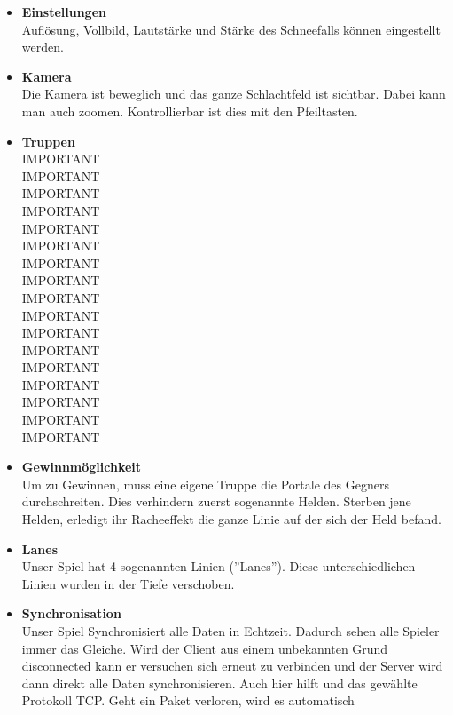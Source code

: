 \begin{itemize}
\begin{itemize}
        \end{itemize}
    \item \textbf{Einstellungen} \\
        Auflösung, Vollbild, Lautstärke und Stärke des Schneefalls können eingestellt werden.
    \item \textbf{Kamera} \\
        Die Kamera ist beweglich und das ganze Schlachtfeld ist sichtbar. Dabei kann man auch zoomen. Kontrollierbar ist dies mit den Pfeiltasten.
    \item \textbf{Truppen} \\
        IMPORTANT\\
        IMPORTANT\\
        IMPORTANT\\
        IMPORTANT\\
        IMPORTANT\\
        IMPORTANT\\
        IMPORTANT\\
        IMPORTANT\\
        IMPORTANT\\
        IMPORTANT\\
        IMPORTANT\\
        IMPORTANT\\
        IMPORTANT\\
        IMPORTANT\\
        IMPORTANT\\
        IMPORTANT\\
        IMPORTANT\\
    \item \textbf{Gewinnmöglichkeit} \\
        Um zu Gewinnen, muss eine eigene Truppe die Portale des Gegners durchschreiten. Dies verhindern zuerst sogenannte Helden. Sterben jene Helden, erledigt ihr Racheeffekt die
        ganze Linie auf der sich der Held befand.
    \item \textbf{Lanes} \\
        Unser Spiel hat 4 sogenannten Linien (''Lanes''). Diese unterschiedlichen Linien wurden in der Tiefe verschoben.
    \item \textbf{Synchronisation} \\
        Unser Spiel Synchronisiert alle Daten in Echtzeit. Dadurch sehen alle Spieler immer das Gleiche. Wird der Client aus einem unbekannten Grund disconnected kann er versuchen
        sich erneut zu verbinden und der Server wird dann direkt alle Daten synchronisieren. Auch hier hilft und das gewählte Protokoll TCP. Geht ein Paket verloren, wird es automatisch

\end{itemize}

